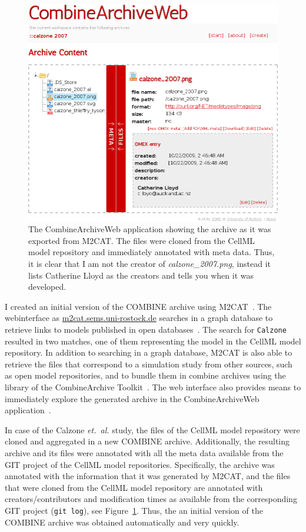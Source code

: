 \begin{figure}
\begin{center}
\includegraphics[width=.8\textwidth]{img/webcat-screenshot-combined.png}
\end{center}
\caption{The CombineArchiveWeb application showing the archive as it was exported from M2CAT. The files were cloned from the CellML model repository and immediately annotated with meta data. Thus, it is clear that I am not the creator of \textit{calzone\_2007.png}, instead it lists Catherine Lloyd as the creators and tells you when it was developed.}
\label{fig:screen:webcat}
\end{figure}

I created an initial version of the COMBINE archive using M2CAT~\cite{m2cat}.
The webinterface as \href{http://m2cat.sems.uni-rostock.de/}{m2cat.sems.uni-rostock.de} searches in a graph database to retrieve links to models published in open databases~\cite{masymos}.
The search for \texttt{Calzone} resulted in two matches, one of them representing the model in the CellML model repository.
In addition to searching in a graph database, M2CAT is also able to retrieve the files that correspond to a simulation study from other sources, such as open model repositories, and to bundle them in combine archives using the library of the CombineArchive Toolkit~\cite{cat}.
The web interface also provides means to immediately explore the generated archive in the CombineArchiveWeb application~\cite{scharm2014}.

In case of the Calzone \emph{et.~al.} study, the files of the CellML model repository were cloned and aggregated in a new COMBINE archive.
Additionally, the resulting archive and its files were annotated with all the meta data available from the GIT project of the CellML model repositories.
Specifically, the archive was annotated with the information that it was generated by M2CAT, and the files that were cloned from the CellML model repository are annotated with creators/contributors and modification times as available from the corresponding GIT project (\texttt{git log}), see Figure~\ref{fig:screen:webcat}. Thus, the an initial version of the COMBINE archive was obtained automatically and very quickly.






